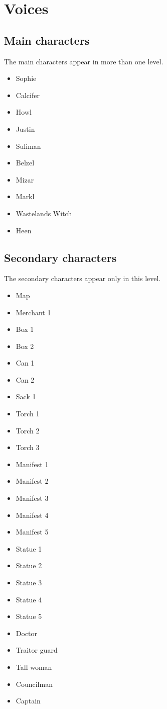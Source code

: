 \section{Voices}

\subsection{Main characters}
The main characters appear in more than one level.
\begin{itemize}
	\item Sophie
	\item Calcifer
	\item Howl
	\item Justin
	\item Suliman
	\item Belzel
	\item Mizar
	\item Markl
	\item Wastelands Witch
	\item Heen
\end{itemize}

\subsection{Secondary characters}
The secondary characters appear only in this level.
\begin{itemize}
	\item Map
	\item Merchant 1
	\item Box 1
	\item Box 2
	\item Can 1
	\item Can 2
	\item Sack 1
	\item Torch 1
	\item Torch 2
	\item Torch 3
	\item Manifest 1
	\item Manifest 2
	\item Manifest 3
	\item Manifest 4
	\item Manifest 5
	\item Statue 1
	\item Statue 2
	\item Statue 3
	\item Statue 4
	\item Statue 5
	\item Doctor
	\item Traitor guard
	\item Tall woman
	\item Councilman
	\item Captain
\end{itemize}


